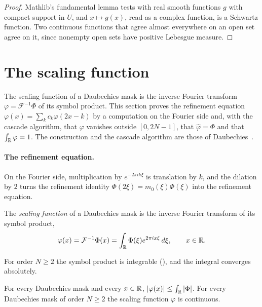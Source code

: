 \begin{proof}
\leanok
Mathlib's fundamental lemma tests with real smooth functions $g$ with compact support in $U$,
and $x \mapsto g(x)$, read as a complex function, is a Schwartz function. Two continuous
functions that agree almost everywhere on an open set agree on it, since nonempty open sets
have positive Lebesgue measure.
\end{proof}

\section{The scaling function}

The scaling function of a Daubechies mask is the inverse Fourier transform
$\varphi = \mathcal F^{-1} \Phi$ of its symbol product. This section proves the refinement
equation $\varphi(x) = \sum_k c_k \varphi(2x - k)$ by a computation on the Fourier side and, with
the cascade algorithm, that $\varphi$ vanishes outside $[0, 2N - 1]$, that
$\widehat\varphi = \Phi$ and that $\int_{\mathbb{R}} \varphi = 1$. The construction and the cascade
algorithm are those of Daubechies~\cite{Daubechies}.

\paragraph{The refinement equation.}
On the Fourier side, multiplication by $e^{-2\pi i k \xi}$ is translation by $k$, and the
dilation by $2$ turns the refinement identity $\Phi(2\xi) = m_0(\xi) \Phi(\xi)$ into the
refinement equation.

\begin{definition}
\label{def:daub-scaling-function}
\leanok
{}
The \emph{scaling function} of a Daubechies mask is the inverse Fourier transform of its symbol
product,
\[
  \varphi(x) = \mathcal F^{-1} \Phi(x) = \int_{\mathbb{R}} \Phi(\xi) e^{2\pi i x \xi} \, d\xi ,
  \qquad x \in \mathbb{R} .
\]
\end{definition}

For order $N \geq 2$ the symbol product is integrable
(), and the integral converges absolutely.

\begin{proposition}
\label{prop:daub-scaling-continuous}
\leanok
{}
For every Daubechies mask and every $x \in \mathbb{R}$, $|\varphi(x)| \leq \int_{\mathbb{R}} |\Phi|$. For every
Daubechies mask of order $N \geq 2$ the scaling function $\varphi$ is continuous.
\end{proposition}

